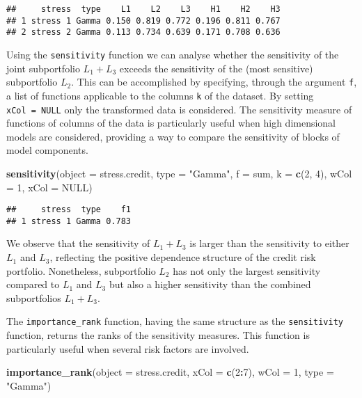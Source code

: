 \documentclass[
]{article}
\newenvironment{Shaded}{\begin{snugshade}}{\end{snugshade}}
\newcommand{\DataTypeTok}[1]{\textcolor[rgb]{0.13,0.29,0.53}{#1}}
\newcommand{\DecValTok}[1]{\textcolor[rgb]{0.00,0.00,0.81}{#1}}
\newcommand{\KeywordTok}[1]{\textcolor[rgb]{0.13,0.29,0.53}{\textbf{#1}}}
\newcommand{\NormalTok}[1]{#1}
\newcommand{\OperatorTok}[1]{\textcolor[rgb]{0.81,0.36,0.00}{\textbf{#1}}}
\newcommand{\OtherTok}[1]{\textcolor[rgb]{0.56,0.35,0.01}{#1}}
\newcommand{\StringTok}[1]{\textcolor[rgb]{0.31,0.60,0.02}{#1}}
\begin{document}
\begin{verbatim}
##     stress  type    L1    L2    L3    H1    H2    H3
## 1 stress 1 Gamma 0.150 0.819 0.772 0.196 0.811 0.767
## 2 stress 2 Gamma 0.113 0.734 0.639 0.171 0.708 0.636
\end{verbatim}

Using the \texttt{sensitivity} function we can analyse whether the sensitivity of the joint subportfolio \(L_1 + L_3\) exceeds the sensitivity of the (most sensitive) subportfolio \(L_2\). This can be accomplished by specifying, through the argument \texttt{f}, a list of functions applicable to the columns \texttt{k} of the dataset. By setting \texttt{xCol\ =\ NULL} only the transformed data is considered. The sensitivity measure of functions of columns of the data is particularly useful when high dimensional models are considered, providing a way to compare the sensitivity of blocks of model components.

\begin{Shaded}
\begin{Highlighting}[]
\KeywordTok{sensitivity}\NormalTok{(}\DataTypeTok{object =}\NormalTok{ stress.credit, }\DataTypeTok{type =} \StringTok{"Gamma"}\NormalTok{, }\DataTypeTok{f =}\NormalTok{ sum, }\DataTypeTok{k =} \KeywordTok{c}\NormalTok{(}\DecValTok{2}\NormalTok{, }\DecValTok{4}\NormalTok{), }
    \DataTypeTok{wCol =} \DecValTok{1}\NormalTok{, }\DataTypeTok{xCol =} \OtherTok{NULL}\NormalTok{)}
\end{Highlighting}
\end{Shaded}

\begin{verbatim}
##     stress  type    f1
## 1 stress 1 Gamma 0.783
\end{verbatim}

We observe that the sensitivity of \(L_1 + L_3\) is larger than the sensitivity to either \(L_1\) and \(L_3\), reflecting the positive dependence structure of the credit risk portfolio. Nonetheless, subportfolio \(L_2\) has not only the largest sensitivity compared to \(L_1\) and \(L_3\) but also a higher sensitivity than the combined subportfolios \(L_1 + L_3\).

The \texttt{importance\_rank} function, having the same structure as the \texttt{sensitivity} function, returns the ranks of the sensitivity measures. This function is particularly useful when several risk factors are involved.

\begin{Shaded}
\begin{Highlighting}[]
\KeywordTok{importance\_rank}\NormalTok{(}\DataTypeTok{object =}\NormalTok{ stress.credit, }\DataTypeTok{xCol =} \KeywordTok{c}\NormalTok{(}\DecValTok{2}\OperatorTok{:}\DecValTok{7}\NormalTok{), }\DataTypeTok{wCol =} \DecValTok{1}\NormalTok{, }\DataTypeTok{type =} \StringTok{"Gamma"}\NormalTok{)}
\end{Highlighting}
\end{Shaded}
\end{document}
